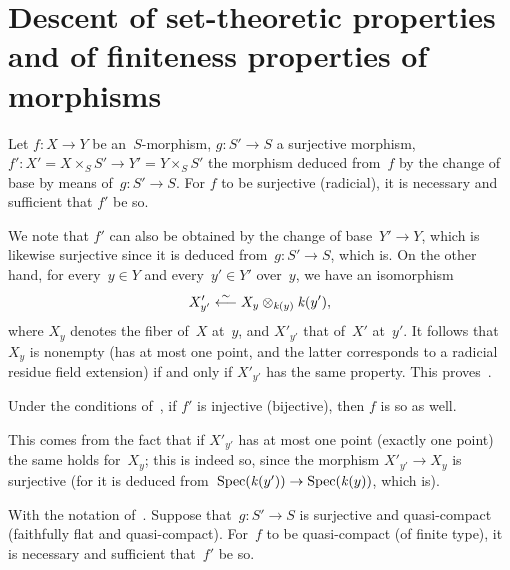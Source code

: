 \section[Descent of set-theoretic properties]{Descent of set-theoretic properties and of finiteness properties of morphisms\protect\footnotemark}
\label{VIII.3}


\begin{proposition}
\label{VIII.3.1}
Let $f\colon X\to Y$ be an~$S$-morphism, $g\colon S'\to S$ a
surjective morphism, $f'\colon X'=X\times_{S}S'\to Y'=Y\times_{S}S'$
the morphism deduced from~$f$ by the change of base by means
of~$g\colon S'\to S$. For $f$ to be surjective (\resp radicial), it
is necessary and sufficient that $f'$ be so.
\end{proposition}

We note that $f'$ can also be obtained by the change of base~$Y'\to
Y$, which is likewise surjective since it is deduced from~$g\colon
S'\to S$, which is. On the other hand, for every~$y\in Y$ and
every~$y'\in Y'$ over~$y$, we have an isomorphism
$$
X'_{y'}\overset{\sim}{\longleftarrow} X_{y}\otimes_{\mathit{k}(y)}\mathit{k}(y'),
$$
where $X_{y}$ denotes the fiber of~$X$ at~$y$, and $X'_{y'}$ that
of~$X'$ at~$y'$. It follows that~$X_{y}$ is nonempty (\resp has at
most one point, and the latter corresponds to a radicial residue
field extension) if and only if
$X'_{y'}$
has the same property. This proves~.

\begin{corollary}
\label{VIII.3.2}
Under the conditions of~, if $f'$ is injective
(\resp bijective), then $f$ is so as well.
\end{corollary}

This comes from the fact that if $X'_{y'}$ has at most one point
(\resp exactly one point) the same holds for~$X_{y}$; this is indeed
so, since the morphism $X'_{y'}\to X_{y}$ is surjective (for it is
deduced from~$\Spec(\kres(y'))\to \Spec(\kres(y))$, which is).

\begin{proposition}
\label{VIII.3.3}
With the notation of~. Suppose that~$g\colon S'\to S$
is surjective and quasi-compact (\resp faithfully flat and
quasi-compact). For~$f$ to be quasi-compact (\resp of finite type),
it is necessary and sufficient that~$f'$ be so.
\end{proposition}

